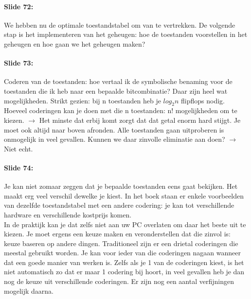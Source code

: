 \documentclass[10pt,a4paper]{book}
\begin{document}
\paragraph{Slide 72:} We hebben nu de optimale toestandstabel om van te vertrekken. De volgende stap is het implementeren van het geheugen: hoe de toestanden voorstellen in het geheugen en hoe gaan we het geheugen maken?

\paragraph{Slide 73:} Coderen van de toestanden: hoe vertaal ik de symbolische benaming voor de toestanden die ik heb naar een bepaalde bitcombinatie? Daar zijn heel wat mogelijkheden. Strikt gezien: bij n toestanden heb je $log_2n$ flipflops nodig. Hoeveel coderingen kan je doen met die n toestanden: n! mogelijkheden om te kiezen. $\rightarrow$ Het minste dat erbij komt zorgt dat dat getal enorm hard stijgt. Je moet ook altijd naar boven afronden. Alle toestanden gaan uitproberen is onmogelijk in veel gevallen. Kunnen we daar zinvolle eliminatie aan doen? $\rightarrow$ Niet echt.

\paragraph{Slide 74:} Je kan niet zomaar zeggen dat je bepaalde toestanden eens gaat bekijken. Het maakt erg veel verschil dewelke je kiest. In het boek staan er enkele voorbeelden van dezelfde toestandstabel met een andere codering: je kan tot verschillende hardware en verschillende kostprijs komen.\\
In de praktijk kan je dat zelfs niet aan uw PC overlaten om daar het beste uit te kiezen. Je moet ergens een keuze maken en veronderstellen dat die zinvol is: keuze baseren op andere dingen. Traditioneel zijn er een drietal coderingen die meestal gebruikt worden. Je kan voor ieder van die coderingen nagaan wanneer dat een goede manier van werken is. Zelfs als je 1 van de coderingen kiest, is het niet automatisch zo dat er maar 1 codering bij hoort, in veel gevallen heb je dan nog de keuze uit verschillende coderingen. Er zijn nog een aantal verfijningen mogelijk daarna.
\end{document}
